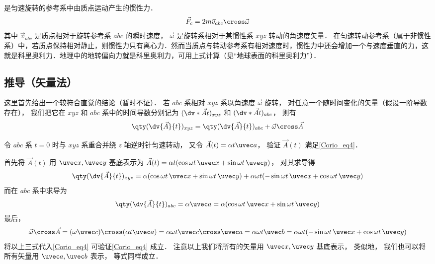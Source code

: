 

是匀速旋转的参考系中由质点运动产生的惯性力．
\begin{equation}
\vec F_c = 2m \vec v_{abc} \cross \vec \omega
\end{equation}
其中 $\vec v_{abc}$ 是质点相对于旋转参考系 $abc$ 的瞬时速度， $\vec\omega$ 是旋转系相对于某惯性系 $xyz$ 转动的角速度矢量．%
在匀速转动参考系（属于非惯性系）中，若质点保持相对静止，则惯性力只有离心力．然而当质点与转动参考系有相对速度时，惯性力中还会增加一个与速度垂直的力，这就是科里奥利力．地理中的地转偏向力就是科里奥利力，可用上式计算（见“地球表面的科里奥利力”）．

\subsection{推导（矢量法）}

这里首先给出一个较符合直觉的结论（暂时不证）． 若 $abc$ 系相对 $xyz$ 系以角速度 $\vec\omega$ 旋转， 对任意一个随时间变化的矢量（假设一阶导数存在）， 我们把它在 $xyz$ 和 $abc$ 系中的时间导数分别记为 $(\dv*{\vec A}{t})_{xyz}$ 和 $(\dv*{\vec A}{t})_{abc}$， 则有
\begin{equation}\label{Corio_eq4}
\qty(\dv{\vec A}{t})_{xyz} = \qty(\dv{\vec A}{t})_{abc} + \vec\omega\cross\vec A
\end{equation}

\begin{exam}{}
令 $abc$ 系 $t = 0$ 时与 $xyz$ 系重合并绕 $z$ 轴逆时针匀速转动， 又令 $\vec A(t) = \alpha t \uvec a$， 验证 $\vec A(t)$ 满足\autoref{Corio_eq4}．

首先将 $\vec A(t)$ 用 $\uvec x, \uvec y$ 基底表示为 $\vec A(t) = \alpha t (\cos\omega t\, \uvec x + \sin\omega t\, \uvec y)$， 对其求导得
\begin{equation}
\qty(\dv{\vec A}{t})_{xyz} = \alpha (\cos\omega t \,\uvec x + \sin\omega t \,\uvec y)
+ \alpha\omega t (-\sin\omega t \,\uvec x + \cos\omega t \,\uvec y)
\end{equation}
而在 $abc$ 系中求导为
\begin{equation}
\qty(\dv{\vec A}{t})_{abc} = \alpha \uvec a = \alpha (\cos\omega t\, \uvec x + \sin\omega t \,\uvec y)
\end{equation}
最后，
\begin{equation}
\vec\omega \cross \vec A = (\omega \uvec c) \cross (\alpha t \uvec a) = \alpha\omega t \uvec c\cross\uvec a = \alpha\omega t \uvec b = \alpha\omega t(-\sin \omega t \,\uvec x + \cos\omega t \,\uvec y)
\end{equation}
将以上三式代入\autoref{Corio_eq4} 可验证\autoref{Corio_eq4} 成立． 注意以上我们将所有的矢量用 $\uvec x, \uvec y$ 基底表示， 类似地， 我们也可以将所有矢量用 $\uvec a, \uvec b$ 表示， 等式同样成立．
\end{exam}

